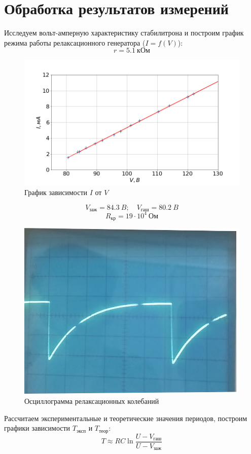 \documentclass[a4paper, fontsize=14pt]{article}
\begin{document}
\section*{Обработка результатов измерений}
Исследуем вольт-амперную характеристику стабилитрона и построим график режима работы релаксационного генератора ($I = f(V)$):
\[
r = 5.1\ \text{кОм}
\]
\begin{figure}[H]
		\includegraphics[width = 1.0\linewidth]{1.png}
		\caption{График зависимости $I$ от $V$}
	\end{figure}
	\[
		V_\text{заж} = 84.3\ B; \quad V_\text{гаш} = 80.2\ B
	\]
	\[
		R_\text{кр} = 19 \cdot 10^4\ \text{Ом}
	\]
	\begin{figure}[H]
		\includegraphics[width = 0.8\linewidth]{pila.png}
		\caption{Осциллограмма релаксационных колебаний}
	\end{figure}
Рассчитаем экспериментальные и теоретические значения периодов, построим графики зависимости $T_\text{эксп}$ и $T_\text{теор}:$
\[
	T \approx RC \ln \frac{U - V_\text{гаш}}{U - V_\text{заж}}
\]
\end{document}
